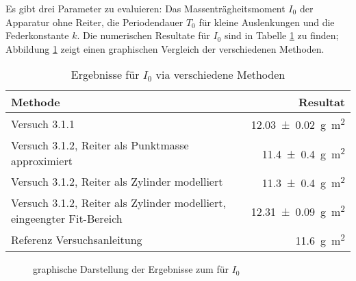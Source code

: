 Es gibt  drei Parameter  zu evaluieren: Das Massentr\"agheitsmoment  $I_0$ der
Apparatur ohne Reiter,  die Periodendauer $T_0$ f\"ur  kleine Auslenkungen und
die Federkonstante $k$. Die numerischen Resultate  f\"ur $I_0$ sind in Tabelle
\ref{tab:resultsI0}  zu  finden;  Abbildung  \ref{fig:resultsI0}  zeigt  einen
graphischen Vergleich der verschiedenen Methoden.

\begin{table}[h!]
    \centering
    \caption{Ergebnisse f\"ur $I_0$ via verschiedene Methoden}
    \label{tab:resultsI0}
    \begin{tabular}{p{70mm}r}
        \toprule
        Methode                                                                 & Resultat \\
        \midrule
        Versuch 3.1.1                                                           & \SI{12.03 \pm 0.02}{\gram\meter\squared} \\
        Versuch 3.1.2, Reiter als Punktmasse approximiert                       & \SI{11.4 \pm 0.4}{\gram\meter\squared} \\
        Versuch 3.1.2, Reiter als Zylinder modelliert                           & \SI{11.3 \pm 0.4}{\gram\meter\squared} \\
        Versuch 3.1.2, Reiter als Zylinder modelliert, eingeengter Fit-Bereich  & \SI{12.31 \pm 0.09}{\gram\meter\squared} \\
        Referenz Versuchsanleitung                                              & \SI{11.6}{\gram\meter\squared} \\
        \bottomrule
    \end{tabular}
\end{table}

\begin{figure}[ht!]
\centering
{}
\caption{graphische Darstellung der Ergebnisse zum f\"ur $I_0$}
\label{fig:resultsI0}
\end{figure}

